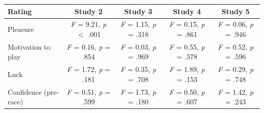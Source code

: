 \begin{tabular}{lcccc}
\toprule
Rating & Study 2 & Study 3 & Study 4 & Study 5 \\
\midrule
Pleasure & \textit{F} = 9.21, \textit{p} $<$ .001 & \textit{F} = 1.15, \textit{p} = .318 & \textit{F} = 0.15, \textit{p} = .861 & \textit{F} = 0.06, \textit{p} = .946 \\
Motivation to play & \textit{F} = 0.16, \textit{p} = .854 & \textit{F} = 0.03, \textit{p} = .969 & \textit{F} = 0.55, \textit{p} = .578 & \textit{F} = 0.52, \textit{p} = .596 \\
Luck & \textit{F} = 1.72, \textit{p} = .181 & \textit{F} = 0.35, \textit{p} = .708 & \textit{F} = 1.89, \textit{p} = .153 & \textit{F} = 0.29, \textit{p} = .748 \\
Confidence (pre-race) & \textit{F} = 0.51, \textit{p} = .599 & \textit{F} = 1.73, \textit{p} = .180 & \textit{F} = 0.50, \textit{p} = .607 & \textit{F} = 1.42, \textit{p} = .243 \\
\bottomrule
\end{tabular}

